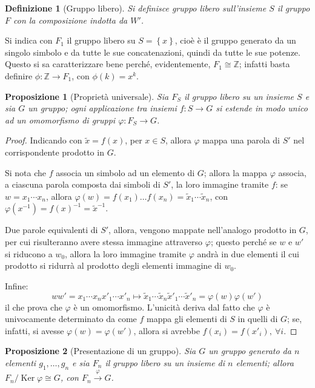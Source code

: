 \documentclass[11pt]{article}
\theoremstyle{style}
\newtheorem{definizione}{Definizione}[section]
\newtheorem{prop}{Proposizione}[section]
\numberwithin{equation}{subsection}
\begin{document}
\begin{definizione}
	[Gruppo libero]
	Si definisce \textit{gruppo libero sull'insieme} $S$ il gruppo $F$ con la composizione indotta da $W'$.
\end{definizione}
\noindent Si indica con $F_1$ il gruppo libero su $S = \left\{ x \right\} $, cio\`e \`e il gruppo generato da un singolo simbolo e da tutte le sue concatenazioni, quindi da tutte le sue potenze.
Questo si sa caratterizzare bene perch\'e, evidentemente, $F_1 \cong \mathbb{Z}$; infatti basta definire $\phi :\mathbb{Z}\to F_1$, con $\phi (k) = x^k$.

\begin{prop}
	[Propriet\`a universale]
	Sia $F_S$ il gruppo libero su un insieme $S$ e sia $G$ un gruppo; ogni applicazione tra insiemi $f: S \to G$ si estende in modo unico ad un omomorfismo di gruppi $\varphi : F_S \to G$.
\end{prop}
	\begin{proof} 
Indicando con $\widetilde{x}=f(x)$, per $x \in S$, allora $\varphi $ mappa una parola di $S'$ nel corrispondente prodotto in $G$.

Si nota che $f$ associa un simbolo ad un elemento di $G$; allora la mappa $\varphi $ associa, a ciascuna parola composta dai simboli di $S'$, la loro immagine tramite $f$: se $w = x_1 \cdots x_n$, allora $\varphi (w) = f(x_1) \ldots f(x_n)=\widetilde{x}_1 \cdots \widetilde{x}_n$, con $\varphi (x^{-1})=f(x)^{-1} = \widetilde{x}^{-1}$.

Due parole equivalenti di $S'$, allora, vengono mappate nell'analogo prodotto in $G$, per cui risulteranno avere stessa immagine attraverso $\varphi $; questo perch\'e se $w$ e $w'$ si riducono a $w_0$, allora la loro immagine tramite $\varphi $ andr\`a in due elementi il cui prodotto si ridurr\`a al prodotto degli elementi immagine di $w_0$.

Infine:
\[
w w'=x_1\cdots x_n x'_1\cdots x'_n\longmapsto \widetilde{x}_1 \cdots \widetilde{x}_n \widetilde{x}'_1 \cdots \widetilde{x}'_n= \varphi (w)\varphi (w')
\] 
il che prova che $\varphi $ \`e un omomorfismo.
L'unicit\`a deriva dal fatto che $\varphi $ \`e univocamente determinato da come $f$ mappa gli elementi di $S$ in quelli di $G$; se, infatti, si avesse $\varphi (w) = \varphi (w')$, allora si avrebbe $f(x_i) = f(x'_i), \ \forall i$.
	\end{proof}
\begin{prop}
	[Presentazione di un gruppo]
	Sia $G$ un gruppo generato da $n$ elementi $g_1,\ldots,g_n$ e sia $F_n$ il gruppo libero su un insieme di $n$ elementi; allora $F_n / \operatorname{Ker} \varphi  \cong G$, con $F_n \stackrel{\varphi }{\longrightarrow} G$.
\end{prop}
\end{document}
